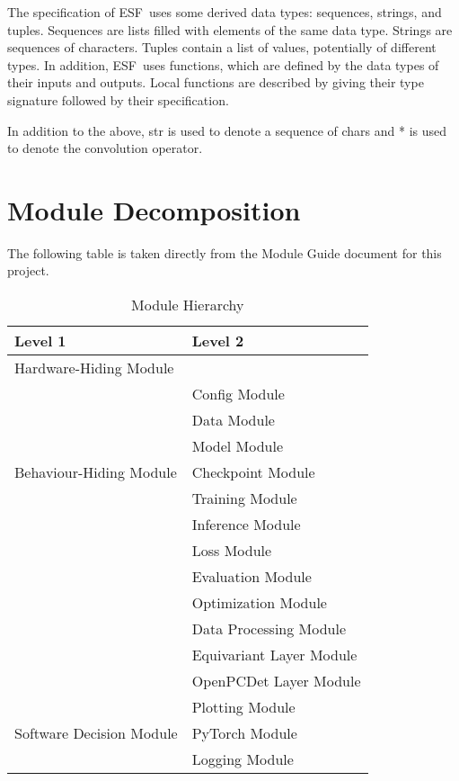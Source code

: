 \documentclass[12pt, titlepage]{article}
\newcommand{\ProjectName}{ESF}
\begin{document}
\noindent
The specification of \ProjectName \ uses some derived data types: sequences, strings, and
tuples. Sequences are lists filled with elements of the same data type. Strings
are sequences of characters. Tuples contain a list of values, potentially of
different types. In addition, \ProjectName \ uses functions, which
are defined by the data types of their inputs and outputs. Local functions are
described by giving their type signature followed by their specification.

In addition to the above, str is used to denote a sequence of chars and * is used to denote the convolution operator.

\section{Module Decomposition}

The following table is taken directly from the Module Guide document for this project.

\begin{table}[h!]
  \centering
  \begin{tabular}{p{} p{}}
  \toprule
  \textbf{Level 1} & \textbf{Level 2}\\
  \midrule
  
  {Hardware-Hiding Module} & ~ \\
  \midrule
  
  \multirow{7}{0.3\textwidth}{Behaviour-Hiding Module} 
  & Config Module\\
  & Data Module\\
  & Model Module\\
  & Checkpoint Module\\
  & Training Module\\
  & Inference Module\\
  & Loss Module\\ 
  & Evaluation Module\\
  & Optimization Module\\
  & Data Processing Module\\
  & Equivariant Layer Module\\
  & OpenPCDet Layer Module\\
  \midrule
  
  \multirow{3}{0.3\textwidth}{Software Decision Module}
  & Plotting Module\\
  & PyTorch Module\\
  & Logging Module\\
  \bottomrule
  
  \end{tabular}
  \caption{Module Hierarchy}
  \label{TblMH}
  \end{table}
\newpage
~\newpage
\end{document}
